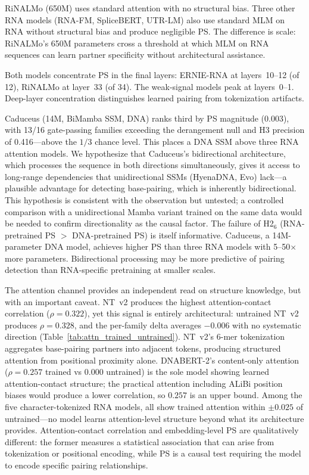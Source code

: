 \documentclass[11pt]{article}
\begin{document}
RiNALMo (650M) uses standard attention with no structural bias.
Three other RNA models (RNA-FM, SpliceBERT, UTR-LM) also use standard
MLM on RNA without structural bias and produce negligible PS. The
difference is scale: RiNALMo's 650M parameters cross a threshold at
which MLM on RNA sequences can learn partner specificity without
architectural assistance.

Both models concentrate PS in the final layers: ERNIE-RNA at
layers~10--12 (of 12), RiNALMo at layer~33 (of 34). The weak-signal
models peak at layers~0--1. Deep-layer concentration distinguishes
learned pairing from tokenization artifacts.

Caduceus (14M, BiMamba SSM, DNA) ranks third by PS magnitude (0.003),
with 13/16 gate-passing families exceeding the derangement null and
H3 precision of 0.416---above the $1/3$ chance level. This places a
DNA SSM above three RNA attention models. We hypothesize that Caduceus's bidirectional
architecture, which processes the sequence in both directions
simultaneously, gives it access to long-range dependencies that
unidirectional SSMs (HyenaDNA, Evo) lack---a plausible advantage for
detecting base-pairing, which is inherently bidirectional. This
hypothesis is consistent with the observation but untested; a
controlled comparison with a unidirectional Mamba variant trained on
the same data would be needed to confirm directionality as the causal
factor. The failure of H2$_6$ (RNA-pretrained PS $>$ DNA-pretrained
PS) is itself informative. Caduceus, a 14M-parameter DNA model,
achieves higher PS than three RNA models with 5--50$\times$ more
parameters. Bidirectional processing may be more predictive of
pairing detection than RNA-specific pretraining at smaller scales.

The attention channel provides an independent read on structure
knowledge, but with an important caveat. NT~v2 produces the highest
attention-contact correlation ($\rho = 0.322$), yet this signal is
entirely architectural: untrained NT~v2 produces $\rho = 0.328$,
and the per-family delta averages $-0.006$ with no systematic
direction (Table~\ref{tab:attn_trained_untrained}). NT~v2's 6-mer
tokenization aggregates base-pairing partners into adjacent tokens,
producing structured attention from positional proximity alone.
DNABERT-2's content-only attention ($\rho = 0.257$ trained vs $0.000$
untrained) is the sole model showing learned attention-contact
structure; the practical attention including ALiBi position biases
would produce a lower correlation, so $0.257$ is an upper bound.
Among the five character-tokenized RNA models, all show trained
attention within $\pm 0.025$ of untrained---no model learns
attention-level structure beyond what its architecture provides.
Attention-contact correlation and embedding-level PS are qualitatively
different: the former measures a statistical association that can
arise from tokenization or positional encoding, while PS is a causal
test requiring the model to encode specific pairing relationships.
\end{document}
